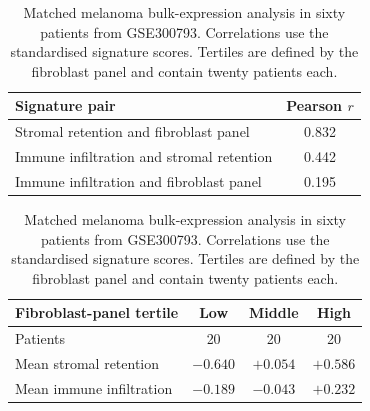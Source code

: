 \begin{table}[!ht]
\centering
\caption{Matched melanoma bulk-expression analysis in sixty patients from GSE300793.
Correlations use the standardised signature scores. Tertiles are defined by the fibroblast
panel and contain twenty patients each.}
\label{tab:bulk_expression}
\small
\begin{tabularx}{\linewidth}{@{}Xc@{}}
\toprule Signature pair & Pearson $r$ \\
\midrule
Stromal retention and fibroblast panel & 0.832 \\
Immune infiltration and stromal retention & 0.442 \\
Immune infiltration and fibroblast panel & 0.195 \\
\bottomrule
\end{tabularx}
\medskip
\begin{tabularx}{\linewidth}{@{}Xccc@{}}
\toprule Fibroblast-panel tertile & Low & Middle & High \\
\midrule
Patients & 20 & 20 & 20 \\
Mean stromal retention & $-0.640$ & $+0.054$ & $+0.586$ \\
Mean immune infiltration & $-0.189$ & $-0.043$ & $+0.232$ \\
\bottomrule
\end{tabularx}
\end{table}
